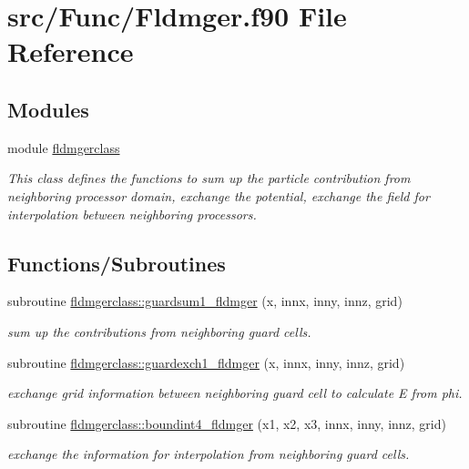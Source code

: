 \hypertarget{_fldmger_8f90}{}\section{src/\+Func/\+Fldmger.f90 File Reference}
\label{_fldmger_8f90}
\subsection*{Modules}
\begin{DoxyCompactItemize}
\item 
module \mbox{\hyperlink{namespacefldmgerclass}{fldmgerclass}}
\begin{DoxyCompactList}\small\item\em This class defines the functions to sum up the particle contribution from neighboring processor domain, exchange the potential, exchange the field for interpolation between neighboring processors. \end{DoxyCompactList}\end{DoxyCompactItemize}
\subsection*{Functions/\+Subroutines}
\begin{DoxyCompactItemize}
\item 
subroutine \mbox{\hyperlink{namespacefldmgerclass_a54886b0763b8458a0560ccf7087b07f1}{fldmgerclass\+::guardsum1\+\_\+fldmger}} (x, innx, inny, innz, grid)
\begin{DoxyCompactList}\small\item\em sum up the contributions from neighboring guard cells. \end{DoxyCompactList}\item 
subroutine \mbox{\hyperlink{namespacefldmgerclass_a028236bf0d8419b6f75a7fb28eb7226b}{fldmgerclass\+::guardexch1\+\_\+fldmger}} (x, innx, inny, innz, grid)
\begin{DoxyCompactList}\small\item\em exchange grid information between neighboring guard cell to calculate E from phi. \end{DoxyCompactList}\item 
subroutine \mbox{\hyperlink{namespacefldmgerclass_a490fceb1792fb1664488b1394dcff5f0}{fldmgerclass\+::boundint4\+\_\+fldmger}} (x1, x2, x3, innx, inny, innz, grid)
\begin{DoxyCompactList}\small\item\em exchange the information for interpolation from neighboring guard cells. \end{DoxyCompactList}\end{DoxyCompactItemize}
